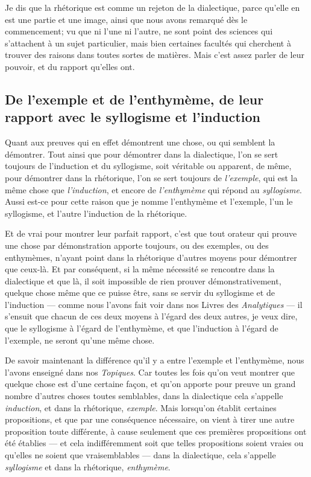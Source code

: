 Je dis que la rhétorique est comme un rejeton de la dialectique, parce qu'elle en est une partie et une image, ainsi que nous avons remarqué dès le
commencement; vu que ni l'une ni l'autre, ne sont point des sciences qui s'attachent à un sujet particulier, mais bien certaines facultés qui cherchent
à trouver des raisons dans toutes sortes de matières. Mais c'est assez parler de leur pouvoir, et du rapport qu'elles ont.

\subsection{De l'exemple et de l'enthymème, de leur rapport avec le syllogisme et l'induction}

Quant aux preuves qui en effet démontrent  une chose, ou qui semblent la démontrer. Tout ainsi que pour démontrer dans la dialectique, l'on se sert toujours
de l'induction et du syllogisme, soit véritable ou apparent, de même, pour démontrer dans la rhétorique, l'on se sert  toujours de \emph{l'exemple}, qui est
la même chose que \emph{l'induction}, et encore de \emph{l'enthymème} qui répond au \emph{syllogisme}. Aussi est-ce pour cette  raison que je nomme l'enthymème
et l'exemple, l'un le syllogisme, et l'autre l'induction de la rhétorique.

Et de vrai pour montrer leur parfait rapport, c'est que tout orateur qui prouve une chose par démonstration apporte toujours, ou des exemples, ou des
enthymèmes, n'ayant point dans la rhétorique d'autres moyens pour démontrer que ceux-là. Et par conséquent, si la même nécessité se rencontre dans la
dialectique et que là, il soit impossible de rien prouver démonstrativement, quelque chose même que ce puisse être, sans se servir du syllogisme et de
l'induction --- comme nous l'avons fait voir dans nos Livres des \emph{Analytiques} --- il s'ensuit que chacun de ces deux moyens à l'égard des deux
autres, je veux dire, que le syllogisme à l'égard de l'enthymème, et que l'induction à l'égard de l'exemple, ne seront qu'une même chose.

\bigbreak

De savoir maintenant la différence qu'il y a entre l'exemple et l'enthymème, nous l'avons enseigné dans nos \emph{Topiques}. Car toutes les fois qu'on veut
montrer que quelque chose est d'une certaine façon, et qu'on apporte pour  preuve un grand nombre d'autres choses toutes semblables, dans la dialectique cela
s'appelle \emph{induction}, et dans la rhétorique, \emph{exemple}. Mais lorsqu'on établit certaines propositions, et que par une conséquence nécessaire, on
vient à tirer une autre proposition toute différente, à cause seulement que ces premières propositions ont été établies --- et cela indifféremment soit que
telles propositions soient vraies ou qu'elles ne soient que vraisemblables --- dans la dialectique, cela  s'appelle \emph{syllogisme} et dans la rhétorique,
\emph{enthymème}.

